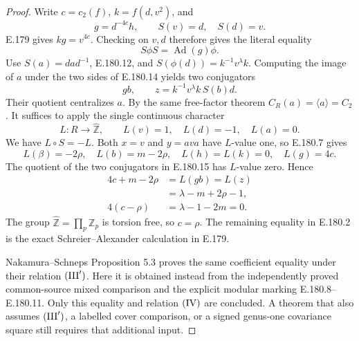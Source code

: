 \begin{proof}
Write \(c=c_2(f)\), \(k=f(d,v^2)\), and
\[
                     g=d^{-4c}h,\qquad S(v)=d,\quad S(d)=v .
\tag{E.180.13}
\]
E.179 gives \(kg=v^{4c}\).  Checking on \(v,d\)
therefore gives the literal equality
\[
                          S\phi S=\operatorname{Ad}(g)\phi .
\tag{E.180.14}
\]
Use \(S(a)=da d^{-1}\), E.180.12, and
\(S(\phi(d))=k^{-1}v^\lambda k\).
Computing the image of \(a\) under the two sides
of E.180.14 yields two conjugators
\[
                        gb,\qquad
                 z=k^{-1}v^\lambda k\,S(b)d .
\tag{E.180.15}
\]
Their quotient centralizes \(a\).  By the same
free-factor theorem \(C_R(a)=\langle a\rangle=C_2\).
It suffices to apply the single continuous character
\[
  L:R\longrightarrow\widehat{\mathbb Z},\qquad
                  L(v)=1,\quad L(d)=-1,\quad L(a)=0 .
\tag{E.180.16}
\]
We have \(L\circ S=-L\).  Both \(x=v\) and
\(y=ava\) have \(L\)-value one, so E.180.7 gives
\[
 L(\beta)=-2\rho,\quad L(b)=m-2\rho,\quad
 L(h)=L(k)=0,\quad L(g)=4c .
\tag{E.180.17}
\]
The quotient of the two conjugators in E.180.15
has \(L\)-value zero.  Hence
\[
 \begin{aligned}
  4c+m-2\rho
       &=L(gb)=L(z)\\
       &=\lambda-m+2\rho-1,\\
  4(c-\rho)&=\lambda-1-2m=0 .
 \end{aligned}
\tag{E.180.18}
\]
The group \(\widehat{\mathbb Z}=\prod_p\mathbb Z_p\)
is torsion free, so \(c=\rho\).
The remaining equality in E.180.2 is the exact
Schreier--Alexander calculation in E.179.

Nakamura--Schneps Proposition 5.3 proves the same
coefficient equality under their relation
\(({\rm III}')\).  Here it is obtained instead
from the independently proved common-source
mixed comparison and the explicit modular
marking E.180.8--E.180.11.
Only this equality and relation \(({\rm IV})\)
are concluded.  A theorem that also assumes
\(({\rm III}')\), a labelled cover comparison,
or a signed genus-one covariance square still
requires that additional input.
\end{proof}
